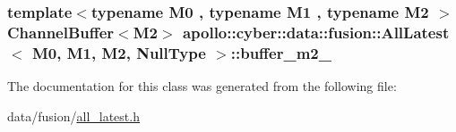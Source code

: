\hypertarget{classapollo_1_1cyber_1_1data_1_1fusion_1_1AllLatest_3_01M0_00_01M1_00_01M2_00_01NullType_01_4_a6023138c347550bc7c5671cfbce8aa20}{
\subsubsection[{buffer\-\_\-m2\-\_\-}]{\setlength{\rightskip}{0pt plus 5cm}template$<$typename M0 , typename M1 , typename M2 $>$ {\bf Channel\-Buffer}$<$M2$>$ {\bf apollo\-::cyber\-::data\-::fusion\-::\-All\-Latest}$<$ M0, M1, M2, {\bf Null\-Type} $>$\-::buffer\-\_\-m2\-\_\-\hspace{0.3cm}{\ttfamily [private]}}}\label{classapollo_1_1cyber_1_1data_1_1fusion_1_1AllLatest_3_01M0_00_01M1_00_01M2_00_01NullType_01_4_a6023138c347550bc7c5671cfbce8aa20}


The documentation for this class was generated from the following file\-:\begin{DoxyCompactItemize}
\item 
data/fusion/\hyperlink{all__latest_8h}{all\-\_\-latest.\-h}\end{DoxyCompactItemize}
